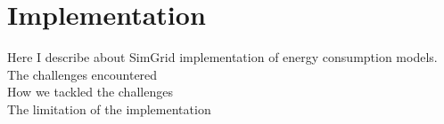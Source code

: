 \chapter{Implementation}
\label{chapter:implementation}

Here I describe about SimGrid implementation of energy consumption models.\\
The challenges encountered\\
How we tackled the challenges\\
The limitation of the implementation\\


